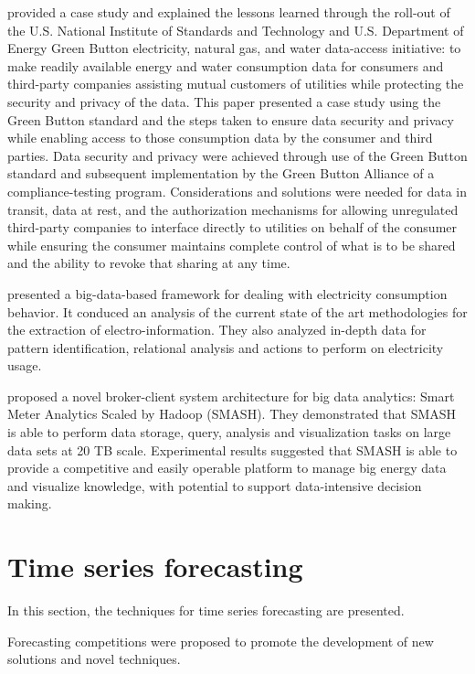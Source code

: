 \cite{Nguyen2019} provided a case study and explained the lessons learned through the roll-out of the U.S. National Institute of Standards and Technology and U.S. Department of Energy Green Button electricity, natural gas, and water data-access initiative: to make readily available energy and water consumption data for consumers and third-party companies assisting mutual customers of utilities while protecting the security and privacy of the data.
This paper presented a case study using the Green Button standard and the steps taken to ensure data security and privacy while enabling access to those consumption data by the consumer and third parties.
Data security and privacy were achieved through use of the Green Button standard and subsequent implementation by the Green Button Alliance of a compliance-testing program.
Considerations and solutions were needed for data in transit, data at rest, and the authorization mechanisms for allowing unregulated third-party companies to interface directly to utilities on behalf of the consumer while ensuring the consumer maintains complete control of what is to be shared and the ability to revoke that sharing at any time.

\cite{8577770} presented a big-data-based framework for dealing with electricity consumption behavior.
It conduced an analysis of the current state of the art methodologies for the extraction of electro-information.
They also analyzed in-depth data for pattern identification, relational analysis and actions to perform on electricity usage.

\cite{WILCOX2019250} proposed a novel broker-client system architecture for big data analytics: Smart Meter Analytics Scaled by Hadoop (SMASH).
They demonstrated that SMASH is able to perform data storage, query, analysis and visualization tasks on large data sets at 20 TB scale.
Experimental results suggested that SMASH is able to provide a competitive and easily operable platform to manage big energy data and visualize knowledge, with potential to support data-intensive decision making.


\section{Time series forecasting}
\label{sec:timeseries}
\vspace{0.2 cm}

In this section, the techniques for time series forecasting are presented.

Forecasting competitions were proposed to promote the development of new solutions and novel techniques. 
\cite{HYNDMAN20207}
\cite{SPILIOTIS202037}

